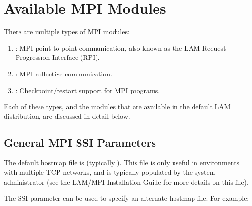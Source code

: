 %
% 
%
%

\chapter{Available MPI Modules}
\label{sec:mpi-ssi}

There are multiple types of MPI modules:

\begin{enumerate}
\item {}: MPI point-to-point communication, also known as the
  LAM Request Progression Interface (RPI).

\item {}: MPI collective communication.

\item {}: Checkpoint/restart support for MPI programs.
\end{enumerate}

Each of these types, and the modules that are available in the default
LAM distribution, are discussed in detail below.


\section{General MPI SSI Parameters}
\label{sec:mpi-ssi:mpi-params}


The default hostmap file is  (typically
).  This file is only useful in
environments with multiple TCP networks, and is typically populated by
the system administrator (see the LAM/MPI Installation Guide for more
details on this file).

The SSI parameter  can be used to specify an
alternate hostmap file.  For example:

